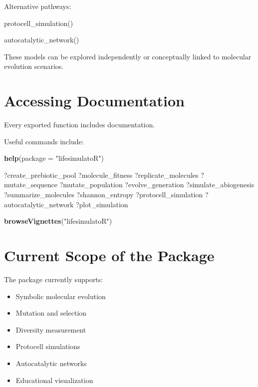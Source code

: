 \documentclass[
  oneside,
  openany]{book}
\newenvironment{Shaded}{\begin{snugshade}}{\end{snugshade}}
\newcommand{\AttributeTok}[1]{\textcolor[rgb]{0.13,0.29,0.53}{#1}}
\newcommand{\FunctionTok}[1]{\textcolor[rgb]{0.13,0.29,0.53}{\textbf{#1}}}
\newcommand{\NormalTok}[1]{#1}
\newcommand{\StringTok}[1]{\textcolor[rgb]{0.31,0.60,0.02}{#1}}
\providecommand{\tightlist}{%
  \setlength{\itemsep}{0pt}\setlength{\parskip}{0pt}}
\begin{document}
Alternative pathways:

\begin{Shaded}
\begin{Highlighting}[]
\NormalTok{protocell\_simulation()}

\NormalTok{autocatalytic\_network()}
\end{Highlighting}
\end{Shaded}

These models can be explored independently or conceptually linked to molecular evolution scenarios.

\section{Accessing Documentation}\label{accessing-documentation}

Every exported function includes documentation.

Useful commands include:

\begin{Shaded}
\begin{Highlighting}[]
\FunctionTok{help}\NormalTok{(}\AttributeTok{package =} \StringTok{"lifesimulatoR"}\NormalTok{)}

\NormalTok{?create\_prebiotic\_pool}
\NormalTok{?molecule\_fitness}
\NormalTok{?replicate\_molecules}
\NormalTok{?mutate\_sequence}
\NormalTok{?mutate\_population}
\NormalTok{?evolve\_generation}
\NormalTok{?simulate\_abiogenesis}
\NormalTok{?summarize\_molecules}
\NormalTok{?shannon\_entropy}
\NormalTok{?protocell\_simulation}
\NormalTok{?autocatalytic\_network}
\NormalTok{?plot\_simulation}

\FunctionTok{browseVignettes}\NormalTok{(}\StringTok{"lifesimulatoR"}\NormalTok{)}
\end{Highlighting}
\end{Shaded}

\section{Current Scope of the Package}\label{current-scope-of-the-package}

The package currently supports:

\begin{itemize}
\tightlist
\item
  Symbolic molecular evolution
\item
  Mutation and selection
\item
  Diversity measurement
\item
  Protocell simulations
\item
  Autocatalytic networks
\item
  Educational visualization
\end{itemize}
\end{document}
